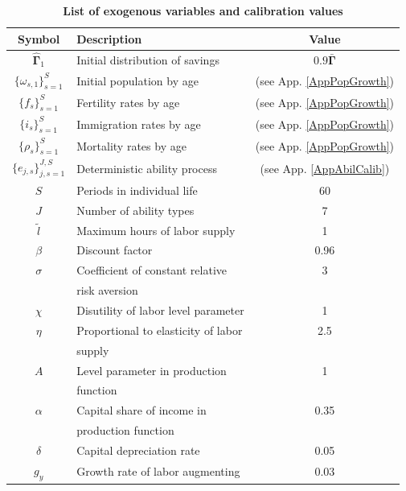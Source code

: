 \documentclass[letterpaper,12pt]{article}
\theoremstyle{definition}
\begin{document}
\begin{spacing}{1.5}
    \begin{table}[htbp] \centering \captionsetup{width=4.4in}
    \caption{\label{TabExogVars}\textbf{List of exogenous variables and calibration values}}
      \begin{threeparttable}
      \begin{tabular}{>{\small}c |>{\small}l |>{\small}c}
        \hline\hline
        Symbol & \quad\quad\quad\quad Description & Value \\
        \hline
        $\bm{\hat{\Gamma}}_1$ & Initial distribution of savings & $0.9\bm{\bar{\Gamma}}$ \\
        $\{\omega_{s,1}\}_{s=1}^S$ & Initial population by age & (see App. \ref{AppPopGrowth}) \\
        $\{f_s\}_{s=1}^S$ & Fertility rates by age & (see App. \ref{AppPopGrowth}) \\
        $\{i_s\}_{s=1}^S$ & Immigration rates by age & (see App. \ref{AppPopGrowth}) \\
        $\{\rho_s\}_{s=1}^S$ & Mortality rates by age & (see App. \ref{AppPopGrowth}) \\
        $\{e_{j,s}\}_{j,s=1}^{J,S}$ & Deterministic ability process & (see App. \ref{AppAbilCalib}) \\
        $S$ & Periods in individual life & 60 \\
        $J$ & Number of ability types & 7 \\
        $\tilde{l}$ & Maximum hours of labor supply & 1 \\
        $\beta$ & Discount factor & 0.96 \\
        $\sigma$ & Coefficient of constant relative & 3 \\
        & \quad risk aversion & \\
        $\chi$ & Disutility of labor level parameter & 1 \\
        $\eta$ & Proportional to elasticity of labor & 2.5 \\
        & \quad supply & \\
        $A$ & Level parameter in production & 1 \\
        & \quad function & \\
        $\alpha$ & Capital share of income in & 0.35 \\
        & \quad production function & \\
        $\delta$ & Capital depreciation rate & 0.05 \\
        $g_y$ & Growth rate of labor augmenting & 0.03 \\

\end{tabular}
\end{threeparttable}
\end{table}
\end{spacing}
\end{document}
